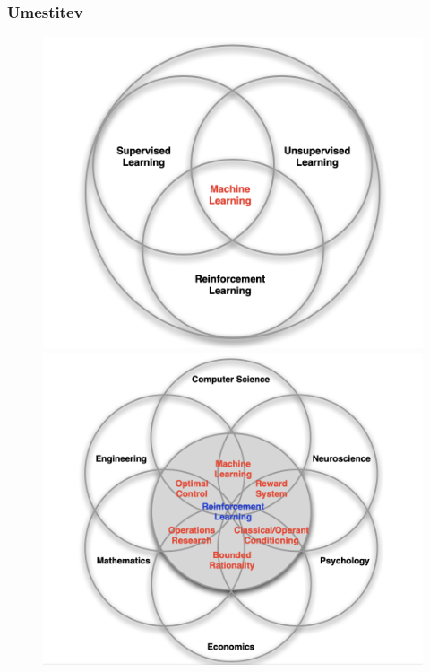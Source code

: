 \documentclass{beamer}    %
\begin{document}
\begin{frame}
    \frametitle{Umestitev}
    \begin{figure}[b]
        \includegraphics[scale=0.31]{slike/uvod-ml.png}
        \includegraphics[scale=0.31]{slike/uvod-rl.png}
    \end{figure}
\end{frame}
\end{document}
